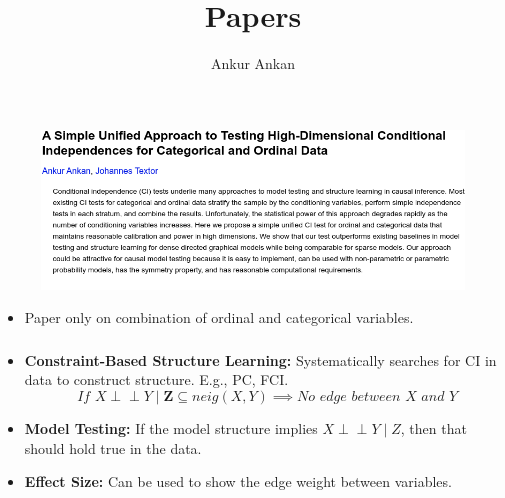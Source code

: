 \documentclass{beamer}
\def\ci{\perp\!\!\!\!\!\perp}
\begin{document}
\title[]{Papers}
\author [] {Ankur Ankan}
\date{}
\maketitle

\begin{frame}
	\frametitle{}
	\begin{figure}
		\centering
		\includegraphics[scale=0.4]{imgs/ankan_textor}
		\caption*{}
	\end{figure}
	\vspace{-2em}
	\begin{itemize}
		\item Paper only on combination of ordinal and categorical variables.	
	\end{itemize}
\end{frame}

\begin{frame}
	\frametitle{}
	\begin{itemize}
		\item \textbf{Constraint-Based Structure Learning:} Systematically searches for CI in data to construct structure. E.g., PC, FCI.
			$$ \textit{ If } X \ci Y \mid \bm{Z} \subseteq \textit{neig}(X, Y)  \implies \textit{No edge between X and Y} $$
		\item \textbf{Model Testing:} If the model structure implies $ X \ci Y \mid Z $, then that should hold true in the data.
		\item \textbf{Effect Size:} Can be used to show the edge weight between variables.
	\end{itemize}
\end{frame}
\end{document}
